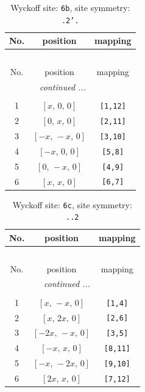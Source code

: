 \documentclass[fleqn,8pt]{jsarticle}
\begin{document}
\begin{longtable}{ccc}
\caption{Wyckoff site: {\tt 6b}, site symmetry: {\tt .2'.}}
 \\
 \hline \hline
No. & position & mapping \\ \hline \endfirsthead

\multicolumn{2}{l}{\tablename\ \thetable{}} \\
 \hline \hline
No. & position & mapping \\ \hline \endhead

 \hline \hline
\multicolumn{2}{r}{\footnotesize\it continued ...} \\ \endfoot

 \hline \hline
\multicolumn{2}{r}{} \\ \endlastfoot

1 & $\left[ x,\, 0,\, 0 \right]$ & {\tt [1,12]} \\ \hline
2 & $\left[ 0,\, x,\, 0 \right]$ & {\tt [2,11]} \\ \hline
3 & $\left[ - x,\, - x,\, 0 \right]$ & {\tt [3,10]} \\ \hline
4 & $\left[ - x,\, 0,\, 0 \right]$ & {\tt [5,8]} \\ \hline
5 & $\left[ 0,\, - x,\, 0 \right]$ & {\tt [4,9]} \\ \hline
6 & $\left[ x,\, x,\, 0 \right]$ & {\tt [6,7]} \\
\end{longtable}
\renewcommand{\arraystretch}{1.2}
\begin{longtable}{ccc}
\caption{Wyckoff site: {\tt 6c}, site symmetry: {\tt ..2}}
 \\
 \hline \hline
No. & position & mapping \\ \hline \endfirsthead

\multicolumn{2}{l}{\tablename\ \thetable{}} \\
 \hline \hline
No. & position & mapping \\ \hline \endhead

 \hline \hline
\multicolumn{2}{r}{\footnotesize\it continued ...} \\ \endfoot

 \hline \hline
\multicolumn{2}{r}{} \\ \endlastfoot

1 & $\left[ x,\, - x,\, 0 \right]$ & {\tt [1,4]} \\ \hline
2 & $\left[ x,\, 2 x,\, 0 \right]$ & {\tt [2,6]} \\ \hline
3 & $\left[ - 2 x,\, - x,\, 0 \right]$ & {\tt [3,5]} \\ \hline
4 & $\left[ - x,\, x,\, 0 \right]$ & {\tt [8,11]} \\ \hline
5 & $\left[ - x,\, - 2 x,\, 0 \right]$ & {\tt [9,10]} \\ \hline
6 & $\left[ 2 x,\, x,\, 0 \right]$ & {\tt [7,12]} \\
\end{longtable}
\end{document}
